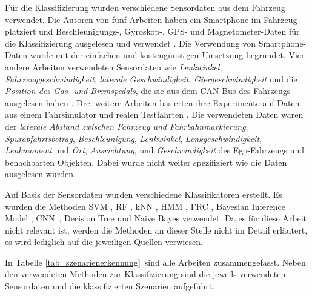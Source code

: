 Für die Klassifizierung wurden verschiedene Sensordaten aus dem Fahrzeug verwendet. Die Autoren von fünf Arbeiten haben ein Smartphone im Fahrzeug platziert und Beschleunigungs-, Gyroskop-, GPS- und Magnetometer-Daten für die Klassifizierung ausgelesen und verwendet \cite{xie2018driving, cervantes2016vehicle, woo2016manoeuvre, camlica2016feature, arroyo2016adaptive}. Die Verwendung von Smartphone-Daten wurde mit der einfachen und kostengünstigen Umsetzung begründet. Vier andere Arbeiten verwendeten Sensordaten wie \textit{Lenkwinkel}, \textit{Fahrzeuggeschwindigkeit}, \textit{laterale Geschwindigkeit}, \textit{Giergeschwindigkeit} und die \textit{Position des Gas- und Bremspedals}, die sie aus dem CAN-Bus des Fahrzeugs ausgelesen haben \cite{zheng2017lane, zheng2015non, li2015lane, zheng2014threshold}. Drei weitere Arbeiten basierten ihre Experimente auf Daten aus einem Fahrsimulator \cite{sun2017robust, zheng2016drivers} und realen Testfahrten \cite{gruner2017spatiotemporal}. Die verwendeten Daten waren der \textit{laterale Abstand zwischen Fahrzeug und Fahrbahnmarkierung}, \textit{Spurabfahrtsbetrag}, \textit{Beschleunigung}, \textit{Lenkwinkel}, \textit{Lenkgeschwindigkeit}, \textit{Lenkmoment} und \textit{Ort}, \textit{Ausrichtung}, und \textit{Geschwindigkeit} des Ego-Fahrzeugs und benachbarten Objekten. Dabei wurde nicht weiter spezifiziert wie die Daten ausgelesen wurden.

Auf Basis der Sensordaten wurden verschiedene Klassifikatoren erstellt. Es wurden die Methoden \ac{SVM} \cite{sun2017robust, cervantes2016vehicle, woo2016manoeuvre, camlica2016feature, zheng2016drivers, zheng2015non}, \ac{RF} \cite{xie2018driving, cervantes2016vehicle, zheng2016drivers}, \ac{kNN} \cite{zheng2017lane, camlica2016feature, zheng2016drivers}, \ac{HMM} \cite{zheng2017lane, li2015lane}, \ac{FRC} \cite{cervantes2016vehicle, arroyo2016adaptive}, Bayesian Inference Model \cite{sun2017robust}, \ac{CNN} \cite{gruner2017spatiotemporal}, Decision Tree \cite{zheng2014threshold} und Naive Bayes \cite{camlica2016feature} verwendet. Da es für diese Arbeit nicht relevant ist, werden die Methoden an dieser Stelle nicht im Detail erläutert, es wird lediglich auf die jeweiligen Quellen verwiesen.

In Tabelle \ref{tab_szenarienerkennung} sind alle Arbeiten zusammengefasst. Neben den verwendeten Methoden zur Klassifizierung sind die jeweils verwendeten Sensordaten und die klassifizierten Szenarien aufgeführt.

